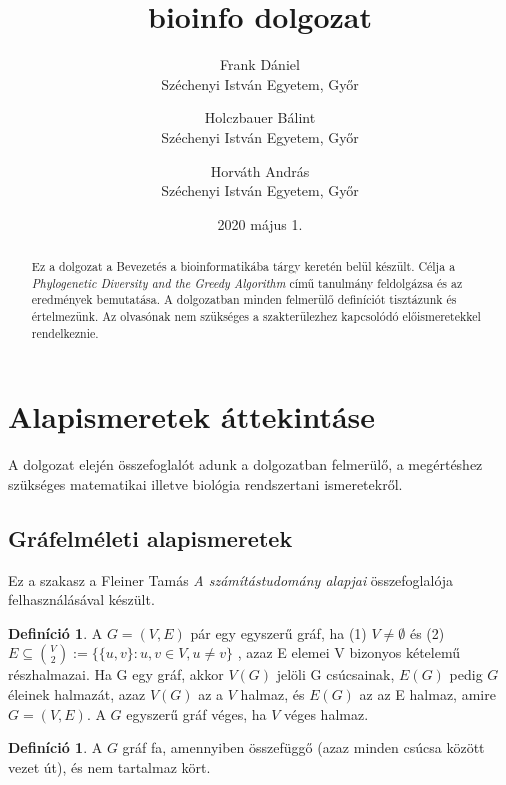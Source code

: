 \documentclass[a4paper,12pt,leqno, notitlepage]{article}%
\theoremstyle{plain}
\theoremstyle{definition}
\newtheorem{defn}[thm]{Definíció} %
\begin{document}
\title{bioinfo dolgozat}
\author{Frank Dániel \\ Széchenyi István Egyetem, Győr
				\and
				Holczbauer Bálint \\ Széchenyi István Egyetem, Győr
				\and
				Horváth András \\ Széchenyi István Egyetem, Győr}
\date{2020 május 1.}
\maketitle

\begin{abstract}

Ez a dolgozat a Bevezetés a bioinformatikába tárgy keretén belül készült.
Célja a \emph{Phylogenetic Diversity and the Greedy Algorithm}\cite{ptrrees_and_greedy} című tanulmány feldolgázsa és az eredmények bemutatása.
A dolgozatban minden felmerülő definíciót tisztázunk és értelmezünk. Az olvasónak nem szükséges a szakterülezhez kapcsolódó előismeretekkel rendelkeznie.

\end{abstract}

\section{Alapismeretek áttekintáse}
\label{sec:alapok}

A dolgozat elején összefoglalót adunk a dolgozatban felmerülő, a megértéshez szükséges matematikai illetve biológia  rendszertani ismeretekről.

\subsection{Gráfelméleti alapismeretek}
\label{grafok}

Ez a szakasz a Fleiner Tamás \emph{A számítástudomány alapjai}\cite{nesz} összefoglalója felhasználásával készült.

\begin{defn}\label{def:graf}
A $G=(V, E)$ pár egy egyszerű gráf, ha (1) $V \neq\emptyset$ és (2) $E \subseteq{V \choose 2} := \{\{u, v\} : u, v \in V, u \neq v\}$
, azaz E elemei V bizonyos kételemű részhalmazai.
Ha G egy gráf, akkor $V (G)$ jelöli G csúcsainak, $E(G)$ pedig $G$ éleinek halmazát, azaz $V (G)$ az a $V$ halmaz, és $E(G)$ az az E halmaz, amire $G = (V, E)$. A $G$ egyszerű gráf véges, ha $V$ véges halmaz.
\end{defn}

\begin{defn}\label{def:fa}
A $G$ gráf fa, amennyiben összefüggő (azaz minden csúcsa között vezet út), és nem tartalmaz kört.
\end{defn}
\end{document}
